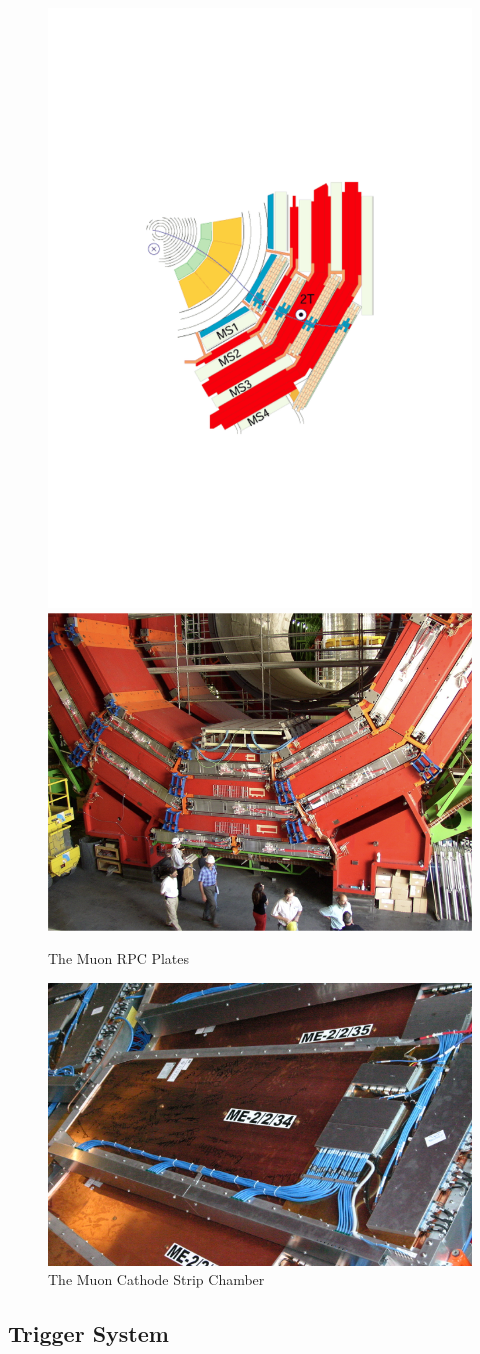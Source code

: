 \begin{figure}
\begin{center}
\includegraphics[width=.45\textwidth]{pics/muon_slice}
\includegraphics[width=.45\textwidth]{pics/rpc_plates}
\end{center}
\caption{The Muon RPC Plates}
\label{fig:muon_slice}
\end{figure}

\begin{figure}
\begin{center}
\includegraphics[width=.45\textwidth]{pics/cathode_strip_chamber}
\end{center}
\caption{The Muon Cathode Strip Chamber}
\label{fig:strip_chamber}
\end{figure}

\subsection{Trigger System}

